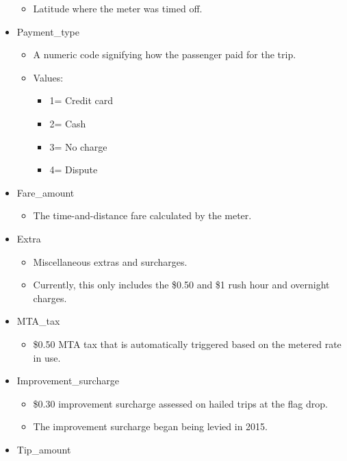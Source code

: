 \documentclass[
  18pt,
  a4paper]{article}
\providecommand{\tightlist}{%
  \setlength{\itemsep}{0pt}\setlength{\parskip}{0pt}}
\begin{document}
\begin{itemize}
  \begin{itemize}
  \tightlist
  \item
    Latitude where the meter was timed off.\\
  \end{itemize}
\item
  Payment\_type

  \begin{itemize}
  \tightlist
  \item
    A numeric code signifying how the passenger paid for the trip.
  \item
    Values:

    \begin{itemize}
    \tightlist
    \item
      1= Credit card
    \item
      2= Cash
    \item
      3= No charge
    \item
      4= Dispute
    \end{itemize}
  \end{itemize}
\item
  Fare\_amount

  \begin{itemize}
  \tightlist
  \item
    The time-and-distance fare calculated by the meter.\\
  \end{itemize}
\item
  Extra

  \begin{itemize}
  \tightlist
  \item
    Miscellaneous extras and surcharges.\\
  \item
    Currently, this only includes the \$0.50 and \$1 rush hour and
    overnight charges.
  \end{itemize}
\item
  MTA\_tax

  \begin{itemize}
  \tightlist
  \item
    \$0.50 MTA tax that is automatically triggered based on the metered
    rate in use.\\
  \end{itemize}
\item
  Improvement\_surcharge

  \begin{itemize}
  \tightlist
  \item
    \$0.30 improvement surcharge assessed on hailed trips at the flag
    drop.
  \item
    The improvement surcharge began being levied in 2015.\\
  \end{itemize}
\item
  Tip\_amount


\end{itemize}
\end{document}
